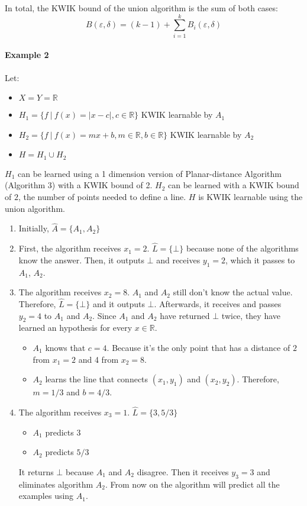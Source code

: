 In total, the KWIK bound of the union algorithm is the sum of both cases:
$$ B(\varepsilon, \delta) = (k - 1) + \sum_{i = 1}^k B_i(\varepsilon, \delta) $$


\paragraph{Example 2}
Let:
\begin{itemize}
  \item $X = Y = \mathbb{R}$
  \item $H_1 = \{ f \ | \ f(x) =|x - c|, c \in \mathbb{R} \}$ KWIK learnable by $A_1$
  \item $H_2 = \{ f \ | \ f(x) = mx + b, m \in \mathbb{R}, b \in \mathbb{R} \}$ KWIK learnable by $A_2$
  \item $H = H_1 \cup H_2$
\end{itemize}

$H_1$ can be learned using a 1 dimension version of Planar-distance Algorithm (Algorithm 3) with a
KWIK bound of 2. $H_2$ can be learned with a KWIK bound of $2$,
the number of points needed to define a line.
$H$ is KWIK learnable using the union algorithm.
\begin{enumerate}
  \item Initially, $\hat{A} = \{A_1, A_2 \}$
  \item First, the algorithm receives $x_1 = 2$. $\hat{L} = \{ \bot \}$ because none of the algorithms know the answer. Then, it outputs $\bot$ and receives $y_1 = 2$, which it passes to $A_1$, $A_2$.
  \item The algorithm receives $x_2 = 8$. $A_1$ and $A_2$ still don't know the actual value. Therefore, $\hat{L} = \{ \bot \}$ and it outputs $\bot$. Afterwards, it receives and passes $y_2 = 4$ to $A_1$ and $A_2$.
    Since $A_1$ and $A_2$ have returned $\bot$ twice, they have learned an hypothesis for every $x \in \mathbb{R}$.
    \begin{itemize}
      \item $A_1$ knows that $c = 4$. Because it's the only point that has a distance of $2$ from $x_1=2$ and 4 from $x_2 = 8$.
      \item $A_2$ learns the line that connects $(x_1, y_1)$ and $(x_2, y_2)$. Therefore, $m = 1/3$ and $b = 4/3$.
    \end{itemize}
  \item The algorithm receives $x_3 = 1$. $\hat{L} = \{ 3, 5/3 \}$
    \begin{itemize}
      \item $A_1$ predicts $3$
      \item $A_2$ predicts $5/3$
    \end{itemize}
    It returns $\bot$ because $A_1$ and $A_2$ disagree. Then it receives $y_3 = 3$ and eliminates algorithm $A_2$.
    From now on the algorithm will predict all the examples using $A_1$.
\end{enumerate}


